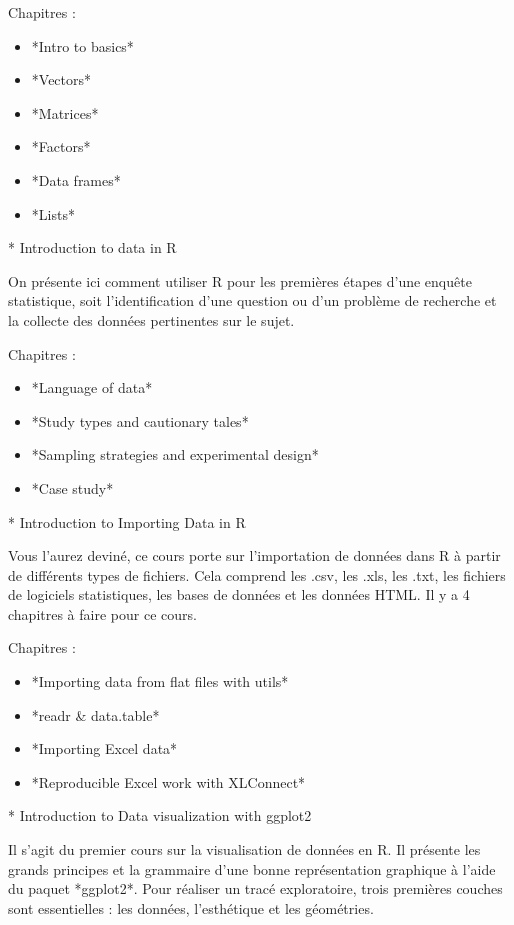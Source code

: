 \documentclass[
  letterpaper,
]{scrbook}
\begin{document}
Chapitres :

\begin{itemize}
\item
  *Intro to basics*
\item
  *Vectors*
\item
  *Matrices*
\item
  *Factors*
\item
  *Data frames*
\item
  *Lists*
\end{itemize}

* Introduction to data in R

On présente ici comment utiliser R pour les premières étapes d'une
enquête statistique, soit l'identification d'une question ou d'un
problème de recherche et la collecte des données pertinentes sur le
sujet.

Chapitres :

\begin{itemize}
\item
  *Language of data*
\item
  *Study types and cautionary tales*
\item
  *Sampling strategies and experimental design*
\item
  *Case study*
\end{itemize}

* Introduction to Importing Data in R

Vous l'aurez deviné, ce cours porte sur l'importation de données dans R
à partir de différents types de fichiers. Cela comprend les .csv, les
.xls, les .txt, les fichiers de logiciels statistiques, les bases de
données et les données HTML. Il y a 4 chapitres à faire pour ce cours.

Chapitres :

\begin{itemize}
\item
  *Importing data from flat files with utils*
\item
  *readr \& data.table*
\item
  *Importing Excel data*
\item
  *Reproducible Excel work with XLConnect*
\end{itemize}

* Introduction to Data visualization with ggplot2

Il s'agit du premier cours sur la visualisation de données en R. Il
présente les grands principes et la grammaire d'une bonne représentation
graphique à l'aide du paquet *ggplot2*. Pour réaliser un tracé
exploratoire, trois premières couches sont essentielles : les données,
l'esthétique et les géométries.
\end{document}

